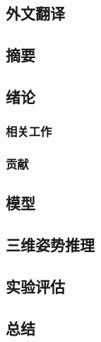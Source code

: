 \cleardoublepage
\begin{refsection}

\chapter{外文翻译}

\section*{摘要}


\section{绪论}


\subsection{相关工作}


\subsection{贡献}


\section{模型}


\section{三维姿势推理}


% 

\section{实验评估}


\section{总结}


\printbibliography[title={参考文献}]
% 
 
\end{refsection}

